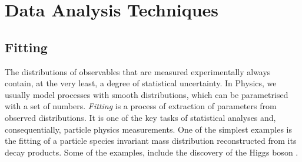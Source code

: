 \chapter{Data Analysis Techniques}

\section{Fitting}

The distributions of observables that are measured experimentally always contain, at the very least, a degree of statistical uncertainty.
In Physics, we usually model processes with smooth distributions, which can be parametrised with a set of numbers. 
\textit{Fitting} is a process of extraction of parameters from observed distributions. 
It is one of the key tasks of statistical analyses and, consequentially, particle physics measurements. 
One of the simplest examples is the fitting of a particle species invariant mass distribution reconstructed from its decay products.
Some of the examples, include the discovery of the Higgs boson \cite{ATLAS:2012yve}.

